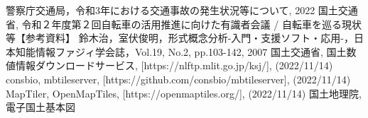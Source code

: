 \documentclass[a4j,8.5pt, twocolumn,fleqn]{jbook}
\begin{document}
\begin{thebibliography}{9}
    警察庁交通局，令和3年における交通事故の発生状況等について, 2022
    国土交通省, 令和２年度第２回自転車の活用推進に向けた有識者会議 / 自転車を巡る現状等【参考資料】
    鈴木治，室伏俊明，形式概念分析-入門・支援ソフト・応用-，日本知能情報ファジィ学会誌，Vol.19, No.2, pp.103-142, 2007
    国土交通省, 国土数値情報ダウンロードサービス, [https://nlftp.mlit.go.jp/ksj/], (2022/11/14)
    consbio, mbtileserver, [https://github.com/consbio/mbtileserver], (2022/11/14)
    MapTiler, OpenMapTiles, [https://openmaptiles.org/], (2022/11/14)
    国土地理院, 電子国土基本図
\end{thebibliography}
\end{document}
